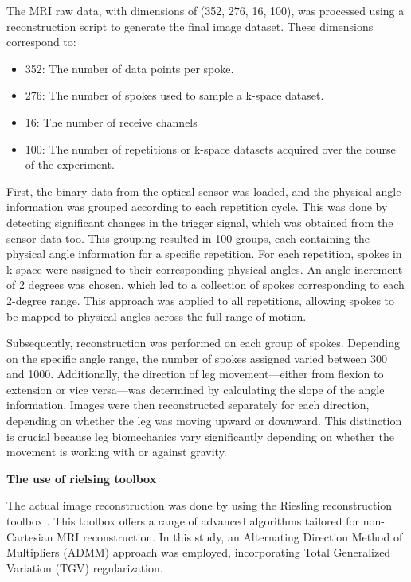 \documentclass{micro-econ-thesis}
\begin{document}
The MRI raw data, with dimensions of (352, 276, 16, 100), was processed using a reconstruction script to generate the final image dataset. These dimensions correspond to: 
\begin{itemize}
	\item 352: The number of data points per spoke.
	\item 276: The number of spokes used to sample a k-space dataset.
	\item 16: The number of receive channels
	\item 100: The number of repetitions or k-space datasets acquired over the course of the experiment.
\end{itemize}


First, the binary data from the optical sensor was loaded, and the physical angle information was grouped according to each repetition cycle. This was done by detecting significant changes in the trigger signal, which was obtained from the sensor data too. This grouping resulted in 100 groups, each containing the physical angle information for a specific repetition. For each repetition, spokes in k-space were assigned to their corresponding physical angles. An angle increment of 2 degrees was chosen, which led to a collection of spokes corresponding to each 2-degree range. This approach was applied to all repetitions, allowing spokes to be mapped to physical angles across the full range of motion.

Subsequently, reconstruction was performed on each group of spokes. Depending on the specific angle range, the number of spokes assigned varied between 300 and 1000. Additionally, the direction of leg movement—either from flexion to extension or vice versa—was determined by calculating the slope of the angle information. Images were then reconstructed separately for each direction, depending on whether the leg was moving upward or downward. This distinction is crucial because leg biomechanics vary significantly depending on whether the movement is working with or against gravity.

\textbf{The use of rielsing toolbox}

The actual image reconstruction was done by using the Riesling reconstruction toolbox \parencite{wood2020riesling}. This toolbox offers a range of advanced algorithms tailored for non-Cartesian MRI reconstruction. In this study, an Alternating Direction Method of Multipliers (ADMM) approach was employed, incorporating Total Generalized Variation (TGV) regularization. 
\end{document}
